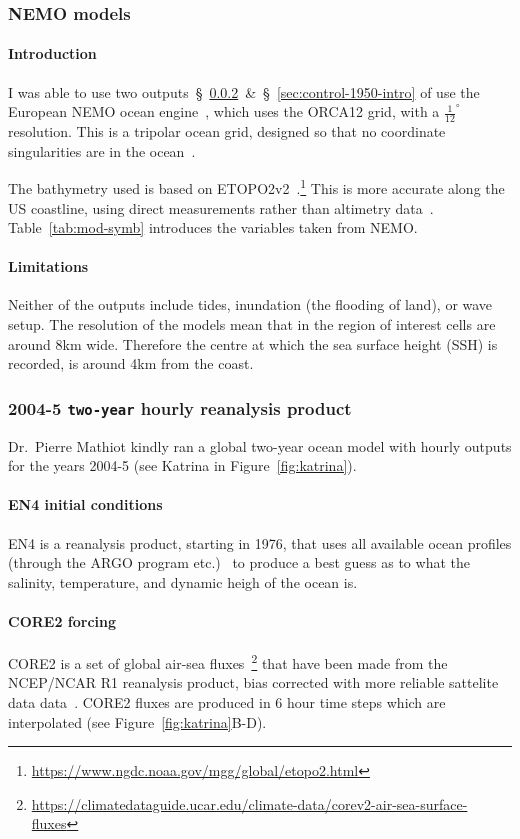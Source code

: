 \subsubsection{NEMO models}
\paragraph{Introduction}
\label{sec:nemo}
I was able to use two outputs~§~\ref{sec:rean-prod}~\&~§~\ref{sec:control-1950-intro}
of use the European NEMO ocean engine~\cite{madec2015nemo}, which uses the ORCA12 grid, with a  $\frac{1}{12}^{\circ}$
resolution.
This is a tripolar ocean grid,
designed so that no coordinate singularities are in the ocean~\cite{madec1996global}.


 The bathymetry used is based on
 ETOPO2v2~\cite{lecointre2011definition, noaa20062}.\footnote{\url{https://www.ngdc.noaa.gov/mgg/global/etopo2.html}}
 This is more accurate along the US coastline, using
 direct measurements rather than altimetry data~\cite{noaa20062}.
 Table~\ref{tab:mod-symb} introduces the variables taken from NEMO.



\paragraph{Limitations}

Neither of the outputs
include tides, inundation (the flooding of land), or wave setup.
The resolution of the models mean that in the region of interest cells are around
8km wide. Therefore the centre at which the sea surface height (SSH) is recorded,
is around 4km from the coast.

\subsubsection{2004-5 \texttt{two-year} hourly reanalysis product}
\label{sec:rean-prod}
Dr.~Pierre Mathiot kindly ran a global two-year ocean model with
hourly outputs for the years 2004-5 (see Katrina
in Figure~\ref{fig:katrina}).

\paragraph{EN4 initial conditions}
EN4 is a reanalysis product, starting in 1976, that uses all available ocean profiles
(through the ARGO program etc.)~\cite{good2013en4, HadObs}
to produce a best guess as to what the salinity, temperature,
and dynamic heigh of the ocean is.


\paragraph{CORE2 forcing}
CORE2 is a set of global air-sea fluxes~\cite{griffies2012datasets,large2009global,
 hurrell2008new}\footnote{\url{https://climatedataguide.ucar.edu/climate-data/corev2-air-sea-surface-fluxes}}
 that have been made from the NCEP/NCAR R1 reanalysis product,
 bias corrected with more reliable sattelite data data~\cite{core2, core2expert}.
 CORE2 fluxes  are produced in 6 hour time steps which are interpolated
 (see Figure~\ref{fig:katrina}B-D).



